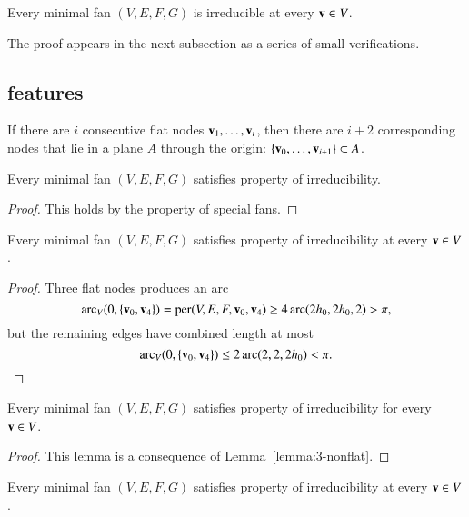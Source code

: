 \begin{lemma}\label{lemma:min-irred}
Every minimal fan $(V,E,F,G)$ is irreducible at every ${\mathbf v}\in V$.
\end{lemma}

The proof appears in the next subsection as a series of small verifications.

\subsection{features}

 If there are $i$ consecutive flat nodes ${\mathbf v}_1,\ldots,{\mathbf v}_i$, then there are  $i+2$ corresponding nodes that lie in a plane $A$ through the origin: $\{{\mathbf v}_0,\ldots,{\mathbf v}_{i+1}\}\subset A$.

\begin{lemma}
Every minimal fan $(V,E,F,G)$ satisfies property  of irreducibility.
\end{lemma}

\begin{proof} This holds by the property  of special fans.
\end{proof}


\begin{lemma}
Every minimal fan $(V,E,F,G)$ satisfies property  of irreducibility at every ${\mathbf v}\in V$.  
\end{lemma}

\begin{proof}  Three flat nodes produces an arc
$$
\operatorname{arc}_V(0,\{{\mathbf v}_0,{\mathbf v}_4\}) = {\operatorname{per}}(V,E,F,{\mathbf v}_0,{\mathbf v}_4) \ge4\operatorname{arc}(2{h_0},2{h_0},2) > \pi,
$$
but the remaining edges  have combined length at most
$$
\operatorname{arc}_V(0,\{{\mathbf v}_0,{\mathbf v}_4\})\le 2\operatorname{arc}(2,2,2{h_0}) < \pi.
$$
\end{proof}

\begin{lemma}
Every minimal fan $(V,E,F,G)$ satisfies property  of irreducibility for every ${\mathbf v}\in V$.
\end{lemma}

\begin{proof}  
This lemma is a consequence of Lemma~\ref{lemma:3-nonflat}.
\end{proof}



\begin{lemma}
Every minimal fan $(V,E,F,G)$ satisfies property  of irreducibility at every ${\mathbf v}\in V$.
\end{lemma}

